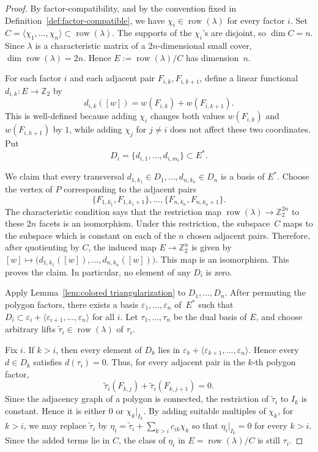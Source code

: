 \documentclass{amsart}
\numberwithin{equation}{section}
\theoremstyle{definition}
\theoremstyle{remark}
\newcommand{\Z}{\mathbb Z}
\DeclareMathOperator{\row}{row}
\begin{document}
\begin{proof}
    By factor-compatibility, and by the convention fixed in Definition~\ref{def:factor-compatible}, we have $\chi_i\in\row(\lambda)$ for every factor $i$.
    Set $C=\langle \chi_1,\ldots,\chi_n\rangle\subset \row(\lambda)$.
    The supports of the $\chi_i$'s are disjoint, so $\dim C=n$.
    Since $\lambda$ is a characteristic matrix of a $2n$-dimensional small cover, $\dim \row(\lambda)=2n$.
    Hence $E:=\row(\lambda)/C$ has dimension~$n$.
        
    For each factor $i$ and each adjacent pair $F_{i,k},F_{i,k+1}$, define a linear functional $d_{i,k} \colon E\to \Z_2$ by
    $$
        d_{i,k}([w])=w(F_{i,k})+w(F_{i,k+1}).
    $$
    This is well-defined because adding $\chi_i$ changes both values $w(F_{i,k})$ and $w(F_{i,k+1})$ by $1$, while adding $\chi_j$ for $j\neq i$ does not affect these two coordinates.
    Put
    $$
            D_i=\{d_{i,1},\ldots,d_{i,m_i}\}\subset E^\ast.
    $$
        
    We claim that every transversal $d_{1,k_1}\in D_1,\ldots,d_{n,k_n}\in D_n$ is a basis of $E^\ast$.
    Choose the vertex of $P$ corresponding to the adjacent pairs
    $$
        \{F_{1,k_1},F_{1,k_1+1}\},\ldots,\{F_{n,k_n},F_{n,k_n+1}\}.
    $$
    The characteristic condition says that the restriction map $\row(\lambda)\to \Z_2^{2n}$ to these $2n$ facets is an isomorphism.
    Under this restriction, the subspace~$C$ maps to the subspace which is constant on each of the $n$ chosen adjacent pairs.
    Therefore, after quotienting by $C$, the induced map $E \to \Z_2^n$ is given by $[w]\mapsto \bigl(d_{1,k_1}([w]),\ldots,d_{n,k_n}([w])\bigr)$.
    This map is an isomorphism.
    This proves the claim.
    In particular, no element of any $D_i$ is zero.
        
    Apply Lemma~\ref{lem:colored triangularization} to $D_1,\ldots,D_n$.
    After permuting the polygon factors, there exists a basis $\varepsilon_1,\ldots,\varepsilon_n$ of~$E^\ast$ such that $D_i\subset\varepsilon_i+\langle \varepsilon_{i+1},\ldots,\varepsilon_n\rangle$ for all $i$.
    Let $\tau_1,\ldots,\tau_n$ be the dual basis of $E$, and choose arbitrary lifts $\widetilde\tau_i\in \row(\lambda)$ of $\tau_i$.
        
    Fix $i$.
    If $k>i$, then every element of $D_k$ lies in $\varepsilon_k+\langle\varepsilon_{k+1},\ldots,\varepsilon_n\rangle$.
    Hence every $d\in D_k$ satisfies $d(\tau_i)=0$.
    Thus, for every adjacent pair in the $k$-th polygon factor,
    $$
        \widetilde\tau_i(F_{k,j})+\widetilde\tau_i(F_{k,j+1})=0.
    $$
    Since the adjacency graph of a polygon is connected, the restriction of $\widetilde\tau_i$ to $I_k$ is constant.
    Hence it is either $0$ or $\chi_k|_{I_k}$.
    By adding suitable multiples of $\chi_k$, for~$k>i$, we may replace $\widetilde\tau_i$ by $\eta_i=\widetilde\tau_i+\sum_{k>i} c_{ik}\chi_k$ so that $\eta_i|_{I_k}=0$ for every $k>i$.
    Since the added terms lie in $C$, the class of $\eta_i$ in $E=\row(\lambda)/C$ is still $\tau_i$.
        

\end{proof}
\end{document}
